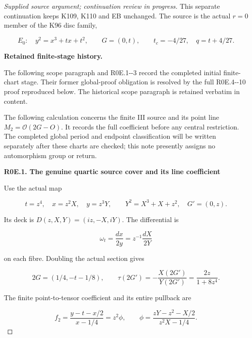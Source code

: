 \begin{proof}[Supplied source argument; continuation review in progress]

This separate continuation keeps K109, K110 and EB unchanged. The source
is the actual \(r=0\) member of the K96 disc family,

\[
 E_0:\quad y^2=x^3+tx+t^2,\qquad G=(0,t),\qquad
 t_c=-4/27,\quad q=t+4/27.
 \tag{R0E.1}
\]

\par

\medskip\noindent\textbf{Retained finite-stage history.}

\par

The following scope paragraph and R0E.1-\/-3 record the completed initial finite-chart stage. Their former global-proof obligation is resolved by the full R0E.4-\/-10 proof reproduced below. The historical scope paragraph is retained verbatim in content.

The following calculation concerns the finite III source and its point
line \(M_2=\mathcal O(2G-O)\). It records the full coefficient before
any central restriction. The completed global period and endpoint
classification will be written separately after these charts are
checked; this note presently assigns no automorphism group or return.

\par

\medskip\noindent\textbf{R0E.1. The genuine quartic source cover and its line coefficient}

\par\nobreak

Use the actual map

\[
 t=z^4,\quad x=z^2X,\quad y=z^3Y,\qquad
 Y^2=X^3+X+z^2,\quad G'=(0,z).
 \tag{R0E.2}
\]

Its deck is \(D(z,X,Y)=(iz,-X,iY)\). The differential is

\[
 \omega_t=\frac{dx}{2y}=z^{-1}\frac{dX}{2Y}
 \tag{R0E.3}
\]

on each fibre. Doubling the actual section gives

\[
 2G=(1/4,-t-1/8),\qquad
 \tau(2G')=-\frac{X(2G')}{Y(2G')}
            =\frac{2z}{1+8z^4}.
 \tag{R0E.4}
\]

The finite point-to-tensor coefficient and its entire pullback are

\[
 f_2=\frac{y-t-x/2}{x-1/4}=z^2\phi,
 \qquad
 \phi=\frac{zY-z^2-X/2}{z^2X-1/4}.
 \tag{R0E.5}
\]


\end{proof}
